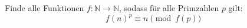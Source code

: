 Finde alle Funktionen $f\colon\mathbb{N} \rightarrow \mathbb{N}$, sodass für alle Primzahlen $p$ gilt: 
\[
f(n)^p \equiv n \pmod{f(p)}
\]
